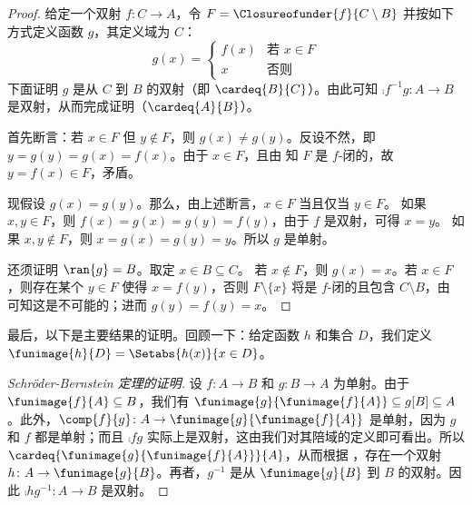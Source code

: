 \documentclass[../../../include/open-logic-section]{subfiles}
\begin{document}
\begin{proof}
	给定一个双射 $f \colon C \to A$，令 $F =
\Closureofunder{f}{C \setminus B}$ 并按如下方式定义函数 $g$，其定义域为 $C$：
	\[
	g(x) =
	\begin{cases}
			f(x) &\text{若 $x \in F$}\\
			x & \text{否则}
		\end{cases}
\]
	下面证明 $g$ 是从 $C$ 到 $B$ 的双射（即 $\cardeq{B}{C}$）。由此可知 $\comp{f^{-1}}{g}
\colon A \to B$ 是双射，从而完成证明（$\cardeq{A}{B}$）。

	首先断言：若 $x \in F$ 但 $y \notin F$，则 $g(x) \neq g(y)$。反设不然，即 $y = g(y) = g(x) =
f(x)$。由于 $x \in F$，且由  知 $F$ 是 $f$-闭的，故 $y = f(x) \in F$，矛盾。

	现假设 $g(x) = g(y)$。那么，由上述断言，$x \in F$ 当且仅当 $y \in F$。
	如果 $x, y \in F$，则 $f(x) = g (x) = g(y) = f(y)$，由于 $f$ 是双射，可得 $x = y$。
	如果 $x, y \notin F$，则 $x = g(x) =
g(y) = y$。所以 $g$ 是单射。

	还须证明 $\ran{g} = B$。取定 $x \in B \subseteq C$。
	若 $x \notin F$，则 $g(x) = x$。若 $x \in F$，则存在某个 $y \in F$ 使得 $x = f(y)$，否则 $F \setminus \{x\}$ 将是 $f$-闭的且包含 $C\setminus B$，由  可知这是不可能的；进而 $g(y) = f(y) = x$。
\end{proof}


最后，以下是主要结果的证明。回顾一下：给定函数 $h$ 和集合 $D$，我们定义 $\funimage{h}{D} = \Setabs{h(x)}{x
\in D}$。

\begin{proof}[Schr\"oder-Bernstein 定理的证明]
	设 $f \colon A \to B$ 和 $g \colon B \to A$ 为单射。由于 $\funimage{f}{A} \subseteq B$，我们有 $\funimage{g}{\funimage{f}{A}} \subseteq
g[B] \subseteq A$。此外，$\comp{f}{g} \colon A \to
\funimage{g}{\funimage{f}{A}}$ 是单射，因为 $g$ 和 $f$ 都是单射；而且 $\comp{f}{g}$ 实际上是双射，这由我们对其陪域的定义即可看出。所以
	$\cardeq{\funimage{g}{\funimage{f}{A}}}{A}$，从而根据 ，存在一个双射 $h \colon A \to
\funimage{g}{B}$。再者，$g^{-1}$ 是从 $\funimage{g}{B}$ 到 $B$ 的双射。因此 $\comp{h}{g^{-1}} \colon A \to B$ 是双射。
\end{proof}
\end{document}
